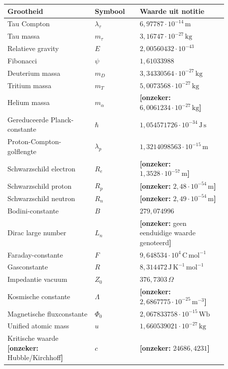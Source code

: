 \documentclass[11pt,a4paper]{article}
\newcommand{\onzeker}[1]{\ifmmode\text{\color{red!70!black}\bfseries[onzeker]}\else\textcolor{red!70!black}{\textbf{[onzeker:} #1\textbf{]}}\fi}
\begin{document}
\begin{longtable}{>{\raggedright\arraybackslash}p{0.35\linewidth} >{\centering\arraybackslash}p{0.18\linewidth} >{\raggedright\arraybackslash}p{0.35\linewidth}}
\toprule
Grootheid & Symbool & Waarde uit notitie\\
\midrule
\endhead
Tau Compton & $\lambda_\tau$ & $6{,}97787\cdot 10^{-14}\,\mathrm{m}$ \\
Tau massa & $m_\tau$ & $3{,}16747\cdot 10^{-27}\,\mathrm{kg}$ \\
Relatieve gravity & $E$ & $2{,}00560432\cdot 10^{-43}$ \\
Fibonacci & $\psi$ & $1{,}61033988$ \\
Deuterium massa & $m_D$ & $3{,}34330564\cdot 10^{-27}\,\mathrm{kg}$ \\
Tritium massa & $m_T$ & $5{,}0073568\cdot 10^{-27}\,\mathrm{kg}$ \\
Helium massa & $m_\alpha$ & \onzeker{$6{,}0061234\cdot 10^{-27}\,\mathrm{kg}$} \\
Gereduceerde Planck-constante & $\hbar$ & $1{,}054571726\cdot 10^{-34}\,\mathrm{J\,s}$ \\
Proton-Compton-golflengte & $\lambda_p$ & $1{,}3214098563\cdot 10^{-15}\,\mathrm{m}$ \\
Schwarzschild electron & $R_e$ & \onzeker{$1{,}3528\cdot 10^{-57}\,\mathrm{m}$} \\
Schwarzschild proton & $R_p$ & \onzeker{$2{,}48\cdot 10^{-54}\,\mathrm{m}$} \\
Schwarzschild neutron & $R_n$ & \onzeker{$2{,}49\cdot 10^{-54}\,\mathrm{m}$} \\
Bodini-constante & $B$ & $279{,}074996$ \\
Dirac large number & $L_n$ & \onzeker{geen eenduidige waarde genoteerd} \\
Faraday-constante & $F$ & $9{,}648534\cdot 10^{4}\,\mathrm{C\,mol^{-1}}$ \\
Gasconstante & $R$ & $8{,}314472\,\mathrm{J\,K^{-1}\,mol^{-1}}$ \\
Impedantie vacuum & $Z_0$ & $376{,}7303\,\Omega$ \\
Kosmische constante & $\Lambda$ & \onzeker{$2{,}6867775\cdot 10^{-25}\,\mathrm{m^{-3}}$} \\
Magnetische fluxconstante & $\Phi_0$ & $2{,}067833758\cdot 10^{-15}\,\mathrm{Wb}$ \\
Unified atomic mass & $u$ & $1{,}660539021\cdot 10^{-27}\,\mathrm{kg}$ \\
Kritische waarde \onzeker{Hubble/Kirchhoff} & $c$ & \onzeker{$24686{,}4231$} \\
\bottomrule
\end{longtable}
\end{document}
